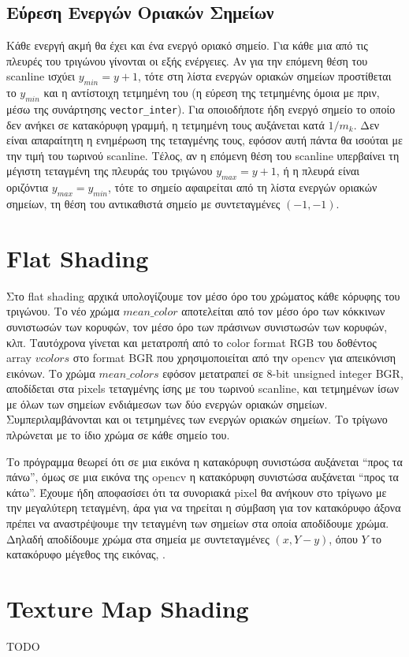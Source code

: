\documentclass{article}
\begin{document}
\subsection{Εύρεση Ενεργών Οριακών Σημείων}
Κάθε ενεργή ακμή θα έχει και ένα ενεργό οριακό σημείο.
Για κάθε μια από τις πλευρές του τριγώνου γίνονται οι εξής ενέργειες.
Αν για την επόμενη θέση του scanline ισχύει $y_{min} = y + 1$, 
τότε στη λίστα ενεργών οριακών σημείων προστίθεται το $y_{min}$
και η αντίστοιχη τετμημένη του (η εύρεση της τετμημένης όμοια με 
πριν, μέσω της συνάρτησης \verb|vector_inter|). Για οποιοδήποτε 
ήδη ενεργό σημείο το οποίο δεν ανήκει σε κατακόρυφη γραμμή, η τετμημένη
τους αυξάνεται κατά $1 / m_k$. Δεν είναι απαραίτητη η ενημέρωση 
της τεταγμένης τους, εφόσον αυτή πάντα θα ισούται με την τιμή του τωρινού scanline.
Τέλος, αν η επόμενη θέση του scanline υπερβαίνει τη μέγιστη τεταγμένη
της πλευράς του τριγώνου $y_{max} = y + 1$, ή η πλευρά είναι οριζόντια 
$y_{max} = y_{min}$, τότε το σημείο αφαιρείται από τη λίστα ενεργών
οριακών σημείων, τη θέση του αντικαθιστά σημείο με συντεταγμένες 
$(-1, -1)$.

\section{Flat Shading}
Στο flat shading αρχικά υπολογίζουμε τον μέσο όρο του χρώματος 
κάθε κόρυφης του τριγώνου. Το νέο χρώμα $mean\_color$ αποτελείται από 
τον μέσο όρο των κόκκινων συνιστωσών των κορυφών, τον μέσο όρο των 
πράσινων συνιστωσών των κορυφών, κλπ. Ταυτόχρονα γίνεται και μετατροπή 
από το color format RGB του δοθέντος array $vcolors$ στο format BGR
που χρησιμοποιείται από την opencv για απεικόνιση εικόνων. 
Το χρώμα $mean\_colors$ εφόσον μετατραπεί σε 8-bit unsigned integer
BGR, αποδίδεται στα pixels τεταγμένης ίσης με του τωρινού scanline,
και τετμημένων ίσων με όλων των σημείων ενδιάμεσων των δύο 
ενεργών οριακών σημείων. Συμπεριλαμβάνονται και οι
τετμημένες των ενεργών οριακών σημείων. Το τρίγωνο πλρώνεται με το 
ίδιο χρώμα σε κάθε σημείο του.

Το πρόγραμμα θεωρεί ότι σε μια εικόνα η κατακόρυφη συνιστώσα αυξάνεται 
``προς τα πάνω'', όμως σε μια εικόνα της opencv η κατακόρυφη συνιστώσα
αυξάνεται ``προς τα κάτω''. Έχουμε ήδη αποφασίσει ότι τα συνοριακά pixel θα 
ανήκουν στο τρίγωνο με την μεγαλύτερη τεταγμένη, άρα για να τηρείται η 
σύμβαση για τον κατακόρυφο άξονα πρέπει να αναστρέψουμε την 
τεταγμένη των σημείων στα οποία αποδίδουμε χρώμα. Δηλαδή 
αποδίδουμε χρώμα στα σημεία με συντεταγμένες
$(x, Y - y)$, όπου $Y$ το κατακόρυφο μέγεθος της εικόνας, .


\section{Texture Map Shading}
TODO
\end{document}
